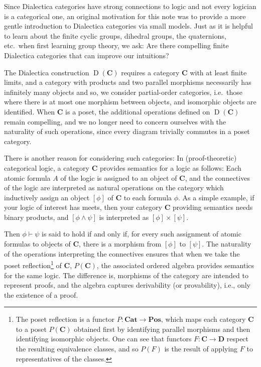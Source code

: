 \documentclass[reqno]{amsart}
\theoremstyle{plain}
\theoremstyle{definition}
\DeclareMathOperator{\D}{D}
\newcommand{\cf}[1]{\mathbf{#1}}
\newcommand{\Cat}{\mathbf{Cat}}
\newcommand{\Pos}{\mathbf{Pos}}
\begin{document}
Since Dialectica categories have strong connections to logic and not every logician is a categorical one, an original motivation for this note was to provide a more gentle introduction to Dialectica categories via small models. Just as it is helpful to learn about the finite cyclic groups, dihedral groups, the quaternions, etc.\ when first learning group theory, we ask: Are there compelling finite Dialectica categories that can improve our intuitions?  


The Dialectica construction $\D(\cf{C}) $ requires a category $\cf{C}$ with at least finite limits, and a category with products and two parallel morphisms necessarily has infinitely many objects and so, we consider partial-order categories, i.e.\ those where there is at most one morphism between objects, and isomorphic objects are identified. When $\cf{C}$ is a poset, the additional operations defined on $\D(\cf{C})$ remain compelling, and we no longer need to concern ourselves with the naturality of such operations, since every diagram trivially commutes in a poset category.

There is another reason for considering such categories: In (proof-theoretic) categorical logic, a category $\cf{C}$ provides semantics for a logic as follows: Each atomic formula $ A $ of the logic is assigned to an object of $\cf{C}$, and the connectives of the logic are interpreted as natural operations on the category which inductively assign an object $ [\phi] $ of $\cf{C}$ to each formula $\phi$. 
As a simple example, if your logic of interest has meets, then your category $\cf{C}$ providing semantics needs binary products, and $[\phi \wedge \psi] $ is interpreted as $[\phi] \times [\psi] $.

Then $\phi \vdash \psi $ is said to hold if and only if, for every such assignment of atomic formulas to objects of $\cf{C}$, there is a morphism from $[\phi] $ to $[\psi]$. The naturality of the operations interpreting the connectives ensures that when we take the poset reflection\footnote{The poset reflection is a functor $P \colon \Cat \to \Pos $, which maps each category $\cf{C}$ to a poset $P(\cf{C})$ obtained first by identifying parallel morphisms and then identifying isomorphic objects. One can see that functors $F \colon \cf{C} \to \cf{D}$ respect the resulting equivalence classes, and so $P(F)$ is the result of applying $F$ to representatives of the classes.} of $\cf{C}$, $ P(\cf{C})$, the associated ordered algebra provides semantics for the same logic. The difference is, morphisms of the category are intended to represent proofs, and the algebra captures derivability (or provability), i.e., only the existence of a proof.
\end{document}
